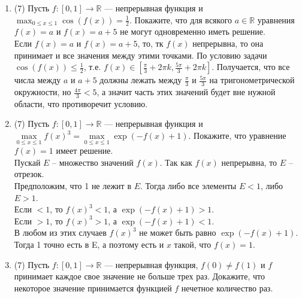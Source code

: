 \documentclass[a4paper]{article}
\begin{document}
\begin{enumerate}
    \item (7) Пусть $f:[0,1]\to \mathbb R$ --- непрерывная функция и $\max_{0\leq x\leq 1}\cos (f(x))=\frac{1}{2}$. Покажите, что для всякого $a\in \mathbb R$ уравнения $f(x) = a$ и $f(x) = a + 5$ не могут одновременно иметь решение.\\
    Если $f(x) = a$ и $f(x) = a + 5$, то, тк $f(x)$ непрерывна, то она принимает и все значения между этими точками. По условию задачи $\cos(f(x)) \le \frac{1}{2}$, т.е. $f(x) \in [\frac{\pi}{3} + 2\pi k, \frac{5\pi}{3} + 2\pi k]$. 
    Получается, что все числа между $a$ и $a + 5$ должны лежать между $\frac{\pi}{3}$ и $\frac{5\pi}{3}$ на тригонометрической окружности, но $\frac{4\pi}{3} < 5$, а значит часть этих значений будет вне нужной области, что противоречит условию.

\item (7) Пусть $f:[0,1]\to \mathbb R$ --- непрерывная функция и $\max\limits_{0\leq x\leq 1}f(x)^3 = \max\limits_{0\leq x\leq 1}\exp(-f(x) + 1)$. Покажите, что уравнение $f(x) = 1$ имеет решение.\\
Пускай $E$ -- множество значений $f(x)$. Так как $f(x)$ непрерывна, то $E$ -- отрезок.\\
Предположим, что 1 не лежит в $E$. Тогда либо все элементы $E < 1$, либо $E > 1$.\\
Если $< 1$, то $f(x)^3 < 1$, а $\exp(-f(x) + 1) > 1$.\\
Если $> 1$, то $f(x)^3 > 1$, а $\exp(-f(x) + 1) < 1$.\\
В любом из этих случаев $f(x)^3$ не может быть равно $\exp(-f(x) + 1)$. Тогда 1 точно есть в E, а поэтому есть и $x$ такой, что $f(x) = 1$.

\item (7) Пусть  $f:[0,1]\to \mathbb R$ --- непрерывная функция, $f(0)\neq f(1)$ и $f$ принимает каждое свое значение не больше трех раз. Докажите, что некоторое значение принимается функцией $f$ нечетное количество раз.
    
    
    
\end{enumerate}
\end{document}
